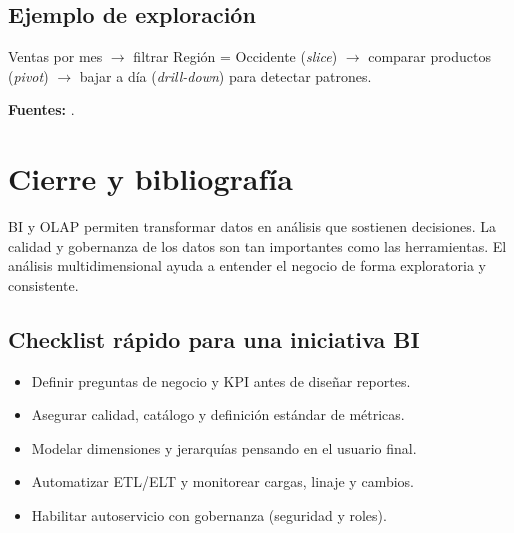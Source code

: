 \documentclass[12pt]{article}
\begin{document}
\subsection*{Ejemplo de exploración}
Ventas por mes $\rightarrow$ filtrar Región = Occidente (\textit{slice}) $\rightarrow$ comparar productos (\textit{pivot}) $\rightarrow$ bajar a día (\textit{drill-down}) para detectar patrones.

\noindent\textbf{Fuentes:} \cite{ibm_olap, kimball_dwtoolkit}.

\section{Cierre y bibliografía}
BI y OLAP permiten transformar datos en análisis que sostienen decisiones. La calidad y gobernanza de los datos son tan importantes como las herramientas. El análisis multidimensional ayuda a entender el negocio de forma exploratoria y consistente.

\subsection*{Checklist rápido para una iniciativa BI}
\begin{itemize}[leftmargin=*, itemsep=0.25em]
  \item Definir preguntas de negocio y KPI antes de diseñar reportes.
  \item Asegurar calidad, catálogo y definición estándar de métricas.
  \item Modelar dimensiones y jerarquías pensando en el usuario final.
  \item Automatizar ETL/ELT y monitorear cargas, linaje y cambios.
  \item Habilitar autoservicio con gobernanza (seguridad y roles).
\end{itemize}

\nocite{*}
\printbibliography
\end{document}
